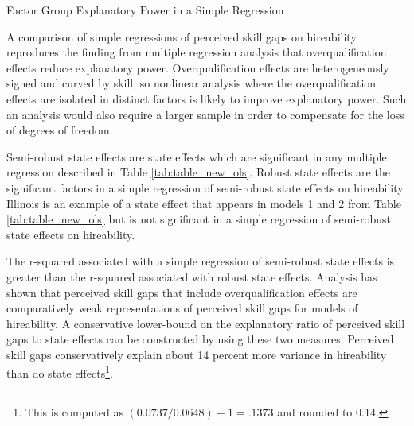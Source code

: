 \documentclass[review]{elsarticle}
\begin{document}
\begin{table}
    \caption{Factor Group Explanatory Power in a Simple Regression}
    \resizebox{\columnwidth}{!}{
        
    }
    \label{tab:explantory_power}
\end{table}

A comparison of simple regressions of perceived skill gaps on hireability reproduces the finding from multiple regression analysis that overqualification effects reduce explanatory power.
Overqualification effects are heterogeneously signed and curved by skill, so nonlinear analysis where the overqualification effects are isolated in distinct factors is likely to improve explanatory power.
Such an analysis would also require a larger sample in order to compensate for the loss of degrees of freedom.

Semi-robust state effects are state effects which are significant in any multiple regression described in Table \ref{tab:table_new_ols}.
Robust state effects are the significant factors in a simple regression of semi-robust state effects on hireability.
Illinois is an example of a state effect that appears in models 1 and 2 from Table \ref{tab:table_new_ols} but is not significant in a simple regression of semi-robust state effects on hireability.

The r-squared associated with a simple regression of semi-robust state effects is greater than the r-squared associated with robust state effects.
Analysis has shown that perceived skill gaps that include overqualification effects are comparatively weak representations of perceived skill gaps for models of hireability.
A conservative lower-bound on the explanatory ratio of perceived skill gaps to state effects can be constructed by using these two measures.
Perceived skill gaps conservatively explain about 14 percent more variance in hireability than do state effects\footnote{
    This is computed as $(0.0737 / 0.0648) - 1 = .1373$ and rounded to 0.14.
}.
\end{document}
